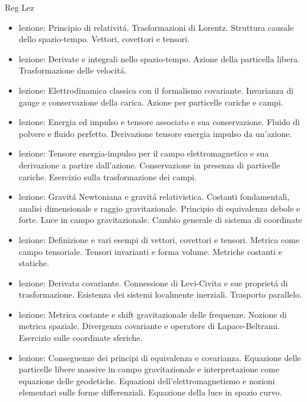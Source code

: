 \begin{frame}[allowframebreaks]{Reg Lez}

\begin{itemize}
  
\item lezione: Principio di relativit\'a. Trasformazioni di Lorentz. Struttura causale dello spazio-tempo. Vettori, covettori e tensori.

\item lezione: Derivate e integrali nello spazio-tempo. Azione della particella libera. Trasformazione delle velocit\'a.

\item lezione: Elettrodinamica classica con il formalismo covariante. Invarianza di gauge e conservazione della carica. Azione per particelle cariche e campi.

\item lezione: Energia ed impulso e tensore associato e sua conservazione. Fluido di polvere e fluido perfetto. Derivazione tensore energia impulso da un'azione.

\item lezione: Tensore energia-impulso per il campo elettromagnetico e sua derivazione a partire dall'azione. Conservazione in presenza di particelle cariche. Esercizio sulla trasformazione dei campi.

\item lezione: Gravit\'a Newtoniana e gravit\'a relativistica. Costanti fondamentali, analisi dimensionale e raggio gravitazionale. Principio di equivalenza debole e forte. Luce in campo gravitazionale. Cambio generale di sistema di coordinate

\item lezione: Definizione e vari esempi di vettori, covettori e tensori. Metrica come campo tensoriale. Tensori invarianti e forma volume. Metriche costanti e statiche.

\item lezione: Derivata covariante. Connessione di Levi-Civita e sue propriet\'a di trasformazione. Esistenza dei sistemi localmente inerziali. Trasporto parallelo.

\item lezione: Metrica costante e shift gravitazionale delle frequenze. Nozione di metrica spaziale. Divergenza covariante e operatore di Lapace-Beltrami. Esercizio sulle coordinate sferiche.

\item lezione: Conseguenze dei principi di equivalenza e covarianza. Equazione delle particelle libere massive in campo gravitazionale e interpretazione come equazione delle geodetiche. Equazioni dell'elettromagnetismo e nozioni elementari sulle forme differenziali. Equazione della luce in spazio curvo.


\end{itemize}
\end{frame}
